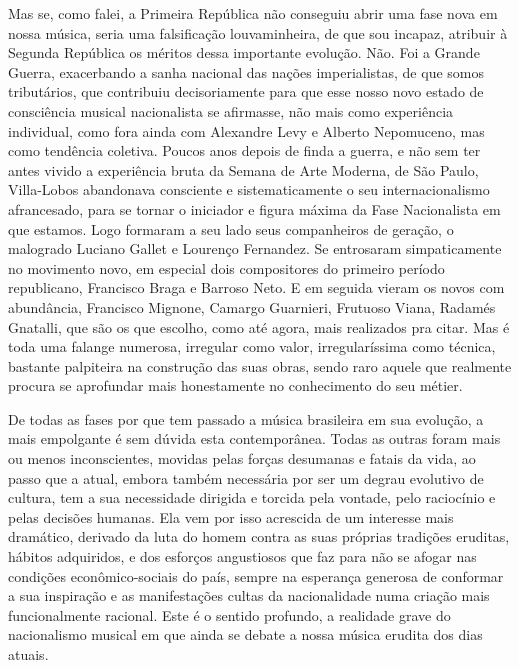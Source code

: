 Mas se, como falei, a Primeira República não conseguiu abrir uma fase
nova em nossa música, seria uma falsificação louvaminheira, de que sou
incapaz, atribuir à Segunda República os méritos dessa importante
evolução. Não. Foi a Grande Guerra, exacerbando a sanha nacional das
nações imperialistas, de que somos tributários, que contribuiu
decisoriamente para que esse nosso novo estado de consciência musical
nacionalista se afirmasse, não mais como experiência individual, como
fora ainda com Alexandre Levy e Alberto Nepomuceno, mas como tendência
coletiva. Poucos anos depois de finda a guerra, e não sem ter antes
vivido a experiência bruta da Semana de Arte Moderna, de São Paulo,
Villa-Lobos abandonava consciente e sistematicamente o seu
internacionalismo afrancesado, para se tornar o iniciador e figura
máxima da Fase Nacionalista em que estamos. Logo formaram a seu lado
seus companheiros de geração, o malogrado Luciano Gallet e Lourenço
Fernandez. Se entrosaram simpaticamente no movimento novo, em especial
dois compositores do primeiro período republicano, Francisco Braga e
Barroso Neto. E em seguida vieram os novos com abundância, Francisco
Mignone, Camargo Guarnieri, Frutuoso Viana, Radamés Gnatalli, que são os
que escolho, como até agora, mais realizados pra citar. Mas é toda uma
falange numerosa, irregular como valor, irregularíssima como técnica,
bastante palpiteira na construção das suas obras, sendo raro aquele que
realmente procura se aprofundar mais honestamente no conhecimento do seu
métier.

De todas as fases por que tem passado a música brasileira em sua
evolução, a mais empolgante é sem dúvida esta contemporânea. Todas as
outras foram mais ou menos inconscientes, movidas pelas forças desumanas
e fatais da vida, ao passo que a atual, embora também necessária por ser
um degrau evolutivo de cultura, tem a sua necessidade dirigida e torcida
pela vontade, pelo raciocínio e pelas decisões humanas. Ela vem por isso
acrescida de um interesse mais dramático, derivado da luta do homem
contra as suas próprias tradições eruditas, hábitos adquiridos, e dos
esforços angustiosos que faz para não se afogar nas condições
econômico-sociais do país, sempre na esperança generosa de conformar a
sua inspiração e as manifestações cultas da nacionalidade numa criação
mais funcionalmente racional. Este é o sentido profundo, a realidade
grave do nacionalismo musical em que ainda se debate a nossa música
erudita dos dias atuais.

